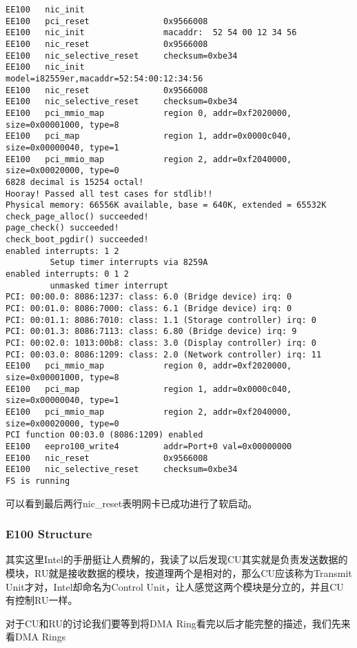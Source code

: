 \documentclass{article}
\begin{document}
\begin{CJK*}{UTF8}{gkai}
\newpage

\begin{lstlisting}[style=console]
EE100	nic_init                
EE100	pci_reset               0x9566008
EE100	nic_init                macaddr:  52 54 00 12 34 56
EE100	nic_reset               0x9566008
EE100	nic_selective_reset     checksum=0xbe34
EE100	nic_init                model=i82559er,macaddr=52:54:00:12:34:56
EE100	nic_reset               0x9566008
EE100	nic_selective_reset     checksum=0xbe34
EE100	pci_mmio_map            region 0, addr=0xf2020000, size=0x00001000, type=8
EE100	pci_map                 region 1, addr=0x0000c040, size=0x00000040, type=1
EE100	pci_mmio_map            region 2, addr=0xf2040000, size=0x00020000, type=0
6828 decimal is 15254 octal!
Hooray! Passed all test cases for stdlib!!
Physical memory: 66556K available, base = 640K, extended = 65532K
check_page_alloc() succeeded!
page_check() succeeded!
check_boot_pgdir() succeeded!
enabled interrupts: 1 2
	     Setup timer interrupts via 8259A
enabled interrupts: 0 1 2
	     unmasked timer interrupt
PCI: 00:00.0: 8086:1237: class: 6.0 (Bridge device) irq: 0
PCI: 00:01.0: 8086:7000: class: 6.1 (Bridge device) irq: 0
PCI: 00:01.1: 8086:7010: class: 1.1 (Storage controller) irq: 0
PCI: 00:01.3: 8086:7113: class: 6.80 (Bridge device) irq: 9
PCI: 00:02.0: 1013:00b8: class: 3.0 (Display controller) irq: 0
PCI: 00:03.0: 8086:1209: class: 2.0 (Network controller) irq: 11
EE100	pci_mmio_map            region 0, addr=0xf2020000, size=0x00001000, type=8
EE100	pci_map                 region 1, addr=0x0000c040, size=0x00000040, type=1
EE100	pci_mmio_map            region 2, addr=0xf2040000, size=0x00020000, type=0
PCI function 00:03.0 (8086:1209) enabled
EE100	eepro100_write4         addr=Port+0 val=0x00000000
EE100	nic_reset               0x9566008
EE100	nic_selective_reset     checksum=0xbe34
FS is running
\end{lstlisting}


可以看到最后两行nic\_reset表明网卡已成功进行了软启动。

\subsubsection{E100 Structure}

其实这里Intel的手册挺让人费解的，我读了以后发现CU其实就是负责发送数据的模块，RU就是接收数据的模块，按道理两个是相对的，那么CU应该称为Transmit Unit才对，Intel却命名为Control Unit，让人感觉这两个模块是分立的，并且CU有控制RU一样。

对于CU和RU的讨论我们要等到将DMA Ring看完以后才能完整的描述，我们先来看DMA Rings


\end{CJK*}
\end{document}
